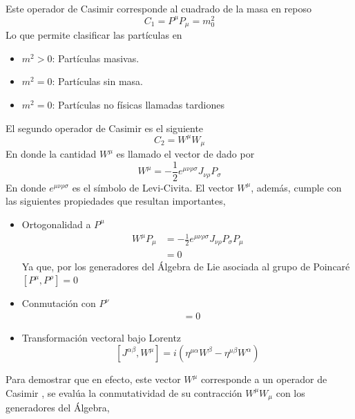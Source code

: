 \documentclass[12pt,letterpaper]{article}
\begin{document}
Este operador de Casimir corresponde al cuadrado de la masa en reposo
\begin{equation}
  C_1 = P^\mu P_\mu = m_0^2
 \end{equation}
 Lo que permite clasificar las partículas en
 \begin{itemize}
   \item $m^2>0$: Partículas masivas.
   \item $m^2=0$: Partículas sin masa.
   \item $m^2=0$: Partículas no físicas llamadas tardiones
 \end{itemize}
El segundo operador de Casimir es el siguiente
\begin{equation}
  C_2 = W^\mu W_\mu
 \end{equation}
 En donde la cantidad $W^\mu$ es llamado el vector de  \cite{weinberg-v1} dado por
 \begin{equation}
   W^\mu = -\frac{1}{2}e^{\mu\nu\rho\sigma} J_{\nu\rho} P_\sigma
  \end{equation}
  En donde $e^{\mu\nu\rho\sigma}$ es el símbolo de Levi-Civita. El vector $W^\mu$, además, cumple con las siguientes propiedades que resultan importantes,
  \begin{itemize}
    \item Ortogonalidad a $P^\mu$
    \begin{align*}
      W^\mu P_\mu & = - \frac{1}{2}e^{\mu\nu\rho\sigma} J_{\nu\rho} P_\sigma P_\mu \\
      & = 0
    \end{align*}
    Ya que, por los generadores del Álgebra de Lie asociada al grupo de Poincaré $[P^\mu,P^\rho]=0$
    \item Conmutación con $P^\nu$
    \begin{align*}
      [P^\nu,W^\mu] & = 0
    \end{align*}
    \item Transformación vectoral bajo Lorentz
    \begin{equation*}
      \left[ J^{\alpha \beta}, W^\mu \right] = i \left( \eta^{\mu\alpha} W^\beta - \eta^{\mu\beta} W^\alpha \right)
    \end{equation*}
  \end{itemize}
    Para demostrar que en efecto, este vector $W^\mu$ corresponde a un operador de Casimir \cite{weinberg-v1}, se evalúa la conmutatividad de su contracción $W^\mu W_\mu$ con los generadores del Álgebra, 
\end{document}
